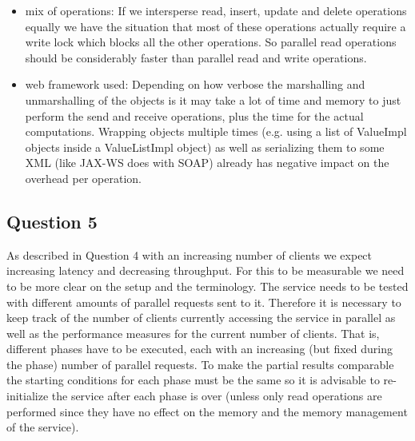 \documentclass[12pt,a4paper]{article}
\begin{document}
\begin{itemize}
  \item mix of operations: If we intersperse read, insert, update and delete operations equally we have the situation that most of these operations actually require a write lock which blocks all the other operations. So parallel read operations should be considerably faster than parallel read and write operations.
  \item web framework used: Depending on how verbose the marshalling and unmarshalling of the objects is it may take a lot of time and memory to just perform the send and receive operations, plus the time for the actual computations. Wrapping objects multiple times (e.g. using a list of ValueImpl objects inside a ValueListImpl object) as well as serializing them to some XML (like JAX-WS does with SOAP) already has negative impact on the overhead per operation.
\end{itemize}

\subsection*{Question 5}
\label{sec:pq5}
  As described in Question 4 with an increasing number of clients we expect increasing latency and decreasing throughput. For this to be measurable we need to be more clear on the setup and the terminology. The service needs to be tested with different amounts of parallel requests sent to it. Therefore it is necessary to keep track of the number of clients currently accessing the service in parallel as well as the performance measures for the current number of clients. That is, different phases have to be executed, each with an increasing (but fixed during the phase) number of parallel requests. To make the partial results comparable the starting conditions for each phase must be the same so it is advisable to re-initialize the service after each phase is over (unless only read operations are performed since they have no effect on the memory and the memory management of the service).
  
\end{document}
